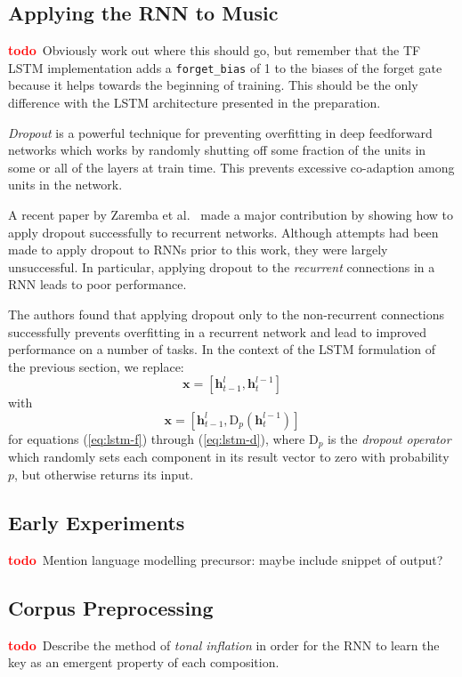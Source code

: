 \documentclass[12pt,a4paper,twoside,openright]{report}
\newcommand{\vect}[1]{\boldsymbol{\mathbf{#1}}}
\newcommand{\todo}{\textcolor{red}{\textbf{todo}~}}
\begin{document}
\subsection{Applying the RNN to Music}

\todo Obviously work out where this should go, but remember that the TF LSTM
implementation adds a \texttt{forget\_bias} of 1 to the biases of the forget
gate because it helps towards the beginning of training. This should be the only
difference with the LSTM architecture presented in the preparation.

\emph{Dropout} \cite{srivastava2014dropout} is a powerful technique for
preventing overfitting in deep feedforward networks which works by randomly
shutting off some fraction of the units in some or all of the layers at train
time. This prevents excessive co-adaption among units in the network.

A recent paper by Zaremba et al.\ \cite{zaremba2014recurrent} made a major
contribution by showing how to apply dropout successfully to recurrent networks.
Although attempts had been made to apply dropout to RNNs prior to this work,
they were largely unsuccessful. In particular, applying dropout to the
\emph{recurrent} connections in a RNN leads to poor performance.

The authors found that applying dropout only to the non-recurrent connections
successfully prevents overfitting in a recurrent network and lead to improved
performance on a number of tasks. In the context of the LSTM formulation of the
previous section, we replace:
$$ \vect{x} = [\vect{h}_{t-1}^l, \vect{h}_t^{l-1}] $$
with
$$ \vect{x} = [\vect{h}_{t-1}^l, \mathrm{D}_p(\vect{h}_t^{l-1})] $$
for equations (\ref{eq:lstm-f}) through (\ref{eq:lstm-d}), where $\mathrm{D}_p$
is the \emph{dropout operator} which randomly sets each component in its result
vector to zero with probability $p$, but otherwise returns its input. 

\subsection{Early Experiments}

\todo Mention language modelling precursor: maybe include snippet of output?

\subsection{Corpus Preprocessing}

\todo Describe the method of \emph{tonal inflation} in order for the RNN to
learn the key as an emergent property of each composition.
\end{document}
